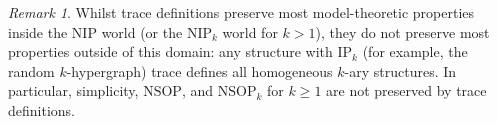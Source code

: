 \documentclass{amsart}
\theoremstyle{definition}
\theoremstyle{remark}
\newtheorem{remark}[theorem]{Remark}
\numberwithin{equation}{section}
\newcommand{\pau}[1]{\textcolor{blue}{#1}}
\begin{document}
\begin{remark}
    Whilst trace definitions preserve most model-theoretic properties inside the $\mathrm{NIP}$ world (or the $\mathrm{NIP}_k$ world for $k>1$), they do not preserve most properties outside of this domain: any structure with $\mathrm{IP}_k$ (for example, the random $k$-hypergraph) trace defines all homogeneous $k$-ary structures. In particular, simplicity, $\mathrm{NSOP}$, and $\mathrm{NSOP}_k$ for $k\geq 1$ are not preserved by trace definitions.
\end{remark}

\end{document}
